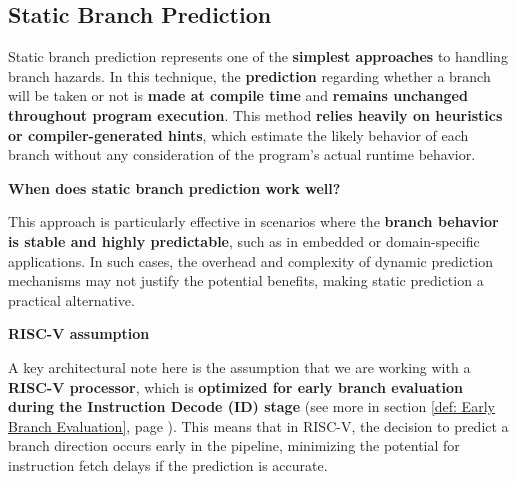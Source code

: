 \subsection{Static Branch Prediction}

Static branch prediction represents one of the \textbf{simplest approaches} to handling branch hazards. In this technique, the \textbf{prediction} regarding whether a branch will be taken or not is \textbf{made at compile time} and \textbf{remains unchanged throughout program execution}. This method \textbf{relies heavily on heuristics or compiler-generated hints}, which estimate the likely behavior of each branch without any consideration of the program's actual runtime behavior.

\highspace
\begin{flushleft}
    \textcolor{Green3}{ \textbf{When does static branch prediction work well?}}
\end{flushleft}
This approach is particularly effective in scenarios where the \textbf{branch behavior is stable and highly predictable}, such as in embedded or domain-specific applications. In such cases, the overhead and complexity of dynamic prediction mechanisms may not justify the potential benefits, making static prediction a practical alternative.

\highspace
\begin{flushleft}
    \textcolor{Red2}{ \textbf{RISC-V assumption}}
\end{flushleft}
A key architectural note here is the assumption that we are working with a \textbf{RISC-V processor}, which is \textbf{optimized for early branch evaluation during the Instruction Decode (ID) stage} (see more in section \ref{def: Early Branch Evaluation}, page ). This means that in RISC-V, the decision to predict a branch direction occurs early in the pipeline, minimizing the potential for instruction fetch delays if the prediction is accurate.
